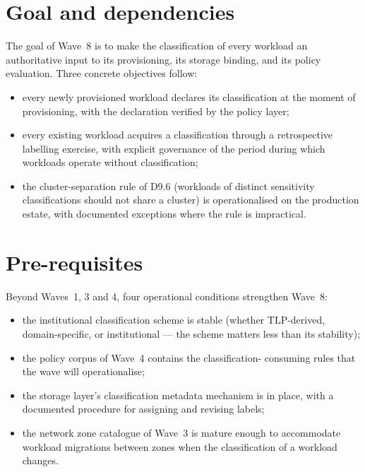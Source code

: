 \section{Goal and dependencies}
\label{sec:w8-goal}

The goal of Wave~8 is to make the classification of every
workload an authoritative input to its provisioning, its storage
binding, and its policy evaluation. Three concrete objectives
follow:

\begin{itemize}[leftmargin=1.5em,nosep]
  \item every newly provisioned workload declares its
    classification at the moment of provisioning, with the
    declaration verified by the policy layer;
  \item every existing workload acquires a classification through
    a retrospective labelling exercise, with explicit governance
    of the period during which workloads operate without
    classification;
  \item the cluster-separation rule of D9.6 (workloads of
    distinct sensitivity classifications should not share a
    cluster) is operationalised on the production estate, with
    documented exceptions where the rule is impractical.
\end{itemize}

\section{Pre-requisites}
\label{sec:w8-prereq}

Beyond Waves~1, 3 and 4, four operational conditions strengthen
Wave~8:

\begin{itemize}[leftmargin=1.5em,nosep]
  \item the institutional classification scheme is stable
    (whether TLP-derived, domain-specific, or institutional ---
    the scheme matters less than its stability);
  \item the policy corpus of Wave~4 contains the classification-
    consuming rules that the wave will operationalise;
  \item the storage layer's classification metadata mechanism is
    in place, with a documented procedure for assigning and
    revising labels;
  \item the network zone catalogue of Wave~3 is mature enough to
    accommodate workload migrations between zones when the
    classification of a workload changes.
\end{itemize}

